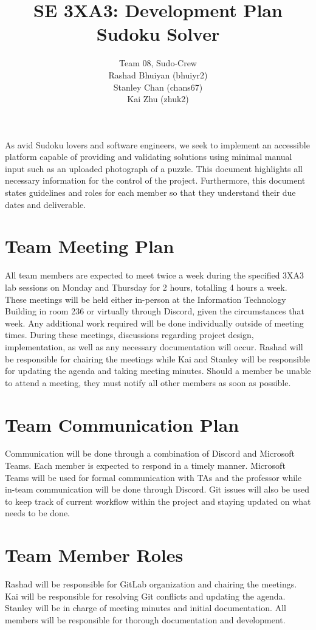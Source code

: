 \documentclass[11pt]{article}
\title{SE 3XA3: Development Plan\\Sudoku Solver}
\author{Team 08, Sudo-Crew
		\\ Rashad Bhuiyan (bhuiyr2)
		\\ Stanley Chan (chans67)
		\\ Kai Zhu (zhuk2)
}
\date{}
\begin{document}
\maketitle

 As avid Sudoku lovers and software engineers, we seek to implement an accessible platform capable of providing and validating solutions using minimal manual input such as an uploaded photograph of a puzzle. This document highlights all necessary information for the control of the project. Furthermore, this document states guidelines and roles for each member so that they understand their due dates and deliverable.

\section{Team Meeting Plan}
All team members are expected to meet twice a week during the specified 3XA3 lab sessions on Monday and Thursday for 2 hours, totalling 4 hours a week. These meetings will be held either in-person at the Information Technology Building in room 236 or virtually through Discord, given the circumstances that week. Any additional work required will be done individually outside of meeting times. During these meetings, discussions regarding project design, implementation, as well as any necessary documentation will occur. Rashad will be responsible for chairing the meetings while Kai and Stanley will be responsible for updating the agenda and taking meeting minutes. Should a member be unable to attend a meeting, they must notify all other members as soon as possible. 

\section{Team Communication Plan}
Communication will be done through a combination of Discord and Microsoft Teams. Each member is expected to respond in a timely manner. Microsoft Teams will be used for formal communication with TAs and the professor while in-team communication will be done through Discord. Git issues will also be used to keep track of current workflow within the project and staying updated on what needs to be done.

\section{Team Member Roles}
Rashad will be responsible for GitLab organization and chairing the meetings. Kai will be responsible for resolving Git conflicts and updating the agenda. Stanley will be in charge of meeting minutes and initial documentation. All members will be responsible for thorough documentation and development.
\end{document}
